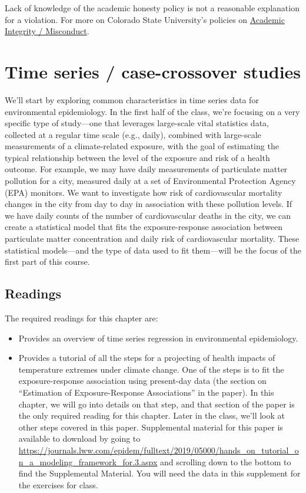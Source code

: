 \documentclass[
]{book}
\begin{document}
Lack of knowledge of the academic honesty policy is not a reasonable explanation for a violation. For more on Colorado State University's policies on \href{https://catalog.colostate.edu/general-catalog/policies/students-responsibilities/\#academic-integrity}{Academic Integrity / Misconduct}.

\chapter{Time series / case-crossover studies}\label{time-series-case-crossover-studies}

We'll start by exploring common characteristics in time series data for
environmental epidemiology. In the first half of the class, we're
focusing on a very specific type of study---one that leverages large-scale
vital statistics data, collected at a regular time scale (e.g., daily),
combined with large-scale measurements of a climate-related exposure, with
the goal of estimating the typical relationship between the level of the
exposure and risk of a health outcome. For example, we may have daily
measurements of particulate matter pollution for a city, measured daily at a set
of Environmental Protection Agency (EPA) monitors. We want to investigate
how risk of cardiovascular mortality changes in the city from day to day
in association with these pollution levels. If we have daily counts of the
number of cardiovascular deaths in the city, we can create a statistical
model that fits the exposure-response association between particulate matter
concentration and daily risk of cardiovascular mortality. These statistical
models---and the type of data used to fit them---will be the focus of the
first part of this course.

\section{Readings}\label{readings}

The required readings for this chapter are:

\begin{itemize}
\item
  \citet{bhaskaran2013time} Provides an overview of time series regression
  in environmental epidemiology.
\item
  \citet{vicedo2019hands} Provides a tutorial of all the steps for a
  projecting of health impacts of temperature extremes under climate change.
  One of the steps is to fit the exposure-response association using present-day data
  (the section on ``Estimation of Exposure-Response Associations'' in the paper).
  In this chapter, we will go into details on that step, and that section of the paper
  is the only required reading for this chapter. Later in the class, we'll
  look at other steps covered in this paper. Supplemental material for this paper is
  available to download by
  going to \url{https://journals.lww.com/epidem/fulltext/2019/05000/hands_on_tutorial_on_a_modeling_framework_for.3.aspx} and scrolling down to the bottom to find the Supplemental Material. You will need the data in this supplement
  for the exercises for class.
\end{itemize}
\end{document}
